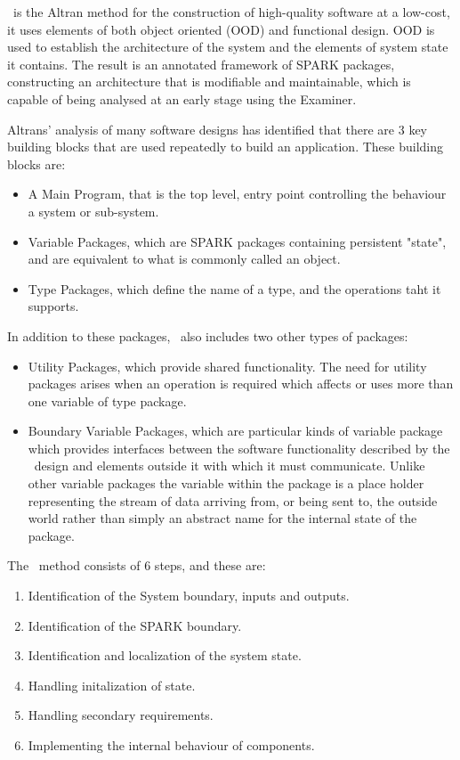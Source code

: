 \label{Introduction}
\informed\ is the Altran method for the construction of high-quality
software at a low-cost, it uses elements of both object oriented (OOD) and functional
 design. OOD is used to establish the architecture of the system and the
 elements of system state it contains. The result is an annotated framework
 of SPARK packages, constructing an architecture that is modifiable and
 maintainable, which is capable of being analysed at an early stage using the Examiner.

Altrans' analysis of many software designs has identified that there are 3 key building
 blocks that are used repeatedly to build an application. These building blocks are:
   \begin{itemize}
  \item A Main Program, that is the top level, entry point controlling the behaviour
   a system or sub-system.
  \item Variable Packages, which are SPARK packages containing persistent "state",
   and are equivalent to what is commonly called an object.
  \item Type Packages, which define the name of a type, and the operations taht
  it supports.
  \end{itemize}

In addition to these packages, \informed\ also includes two other types of packages:
   \begin{itemize}
  \item Utility Packages, which provide shared functionality. The need for utility packages
  arises when an operation is required which affects or uses more than one variable of type
  package.
  \item Boundary Variable Packages, which are particular kinds of variable package which
  provides interfaces between the software functionality described by the \informed\ design
  and elements outside it with which it must communicate. Unlike other variable packages the
  variable within the package is a place holder representing the stream of data arriving from,
  or being sent to, the outside world rather than simply an abstract name for the internal state
  of the package.
  \end{itemize}

The \informed\ method consists of 6 steps, and these are:
   \begin{enumerate}
  \item Identification of the System boundary, inputs and outputs.
  \item Identification of the SPARK boundary.
  \item Identification and localization of the system state.
  \item Handling initalization of state.
  \item Handling secondary requirements.
  \item Implementing the internal behaviour of components.
  \end{enumerate}

